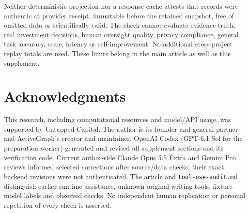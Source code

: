 \documentclass[11pt]{article}
\begin{document}
Neither deterministic projection nor a response cache attests that records were authentic at provider receipt, immutable before the retained snapshot, free of omitted data or scientifically valid. The check cannot evaluate evidence truth, real investment decisions, human oversight quality, privacy compliance, general task accuracy, scale, latency or self-improvement. No additional cross-project replay totals are used. These limits belong in the main article as well as this supplement.
\section*{Acknowledgments}
This research, including computational resources and model/API usage, was supported by Untapped Capital. The author is its founder and general partner and ActiveGraph's creator and maintainer. OpenAI Codex (GPT-6.1 Sol for the preparation worker) generated and revised all supplement sections and its verification code. Current author-side Claude Opus 5.5 Extra and Gemini Pro reviews informed selected corrections after source/data checks; their exact backend revisions were not authenticated. The article and \texttt{tool-use-audit.md} distinguish earlier runtime assistance, unknown original writing tools, fixture-model labels and observed checks. No independent human replication or personal repetition of every check is asserted.
\end{document}
